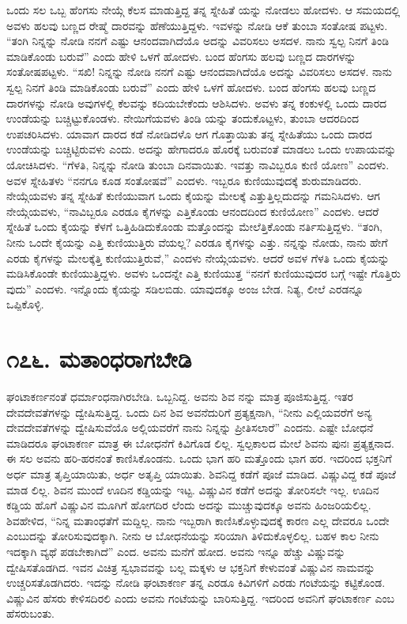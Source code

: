 ಒಂದು ಸಲ ಒಬ್ಬ ಹೆಂಗಸು ನೇಯ್ಗೆ ಕೆಲಸ ಮಾಡುತ್ತಿದ್ದ ತನ್ನ ಸ್ನೇಹಿತೆ ಯನ್ನು ನೋಡಲು ಹೋದಳು. ಆ ಸಮಯದಲ್ಲಿ ಅವಳು ಹಲವು ಬಣ್ಣದ ರೇಷ್ಮೆ ದಾರವನ್ನು ಹೆಣೆಯುತ್ತಿದ್ದಳು. ಇವಳನ್ನು ನೋಡಿ ಆಕೆ ತುಂಬಾ ಸಂತೋಷ ಪಟ್ಟಳು. “ತಂಗಿ ನಿನ್ನನ್ನು ನೋಡಿ ನನಗೆ ಎಷ್ಟು ಆನಂದವಾಗಿದೆಯೊ ಅದನ್ನು ವಿವರಿಸಲು ಅಸದಳ. ನಾನು ಸ್ವಲ್ಪ ನಿನಗೆ ತಿಂಡಿ ಮಾಡಿಕೊಂಡು ಬರುವೆ” ಎಂದು ಹೇಳಿ ಒಳಗೆ ಹೋದಳು. ಬಂದ ಹೆಂಗಸು ಹಲವು ಬಣ್ಣದ ದಾರಗಳನ್ನು ಸಂತೋಷಪಟ್ಟಳು. “ಸಖಿ! ನಿನ್ನನ್ನು ನೋಡಿ ನನಗೆ ಎಷ್ಟು ಆನಂದವಾಗಿದೆಯೊ ಅದನ್ನು ವಿವರಿಸಲು ಅಸದಳ. ನಾನು ಸ್ವಲ್ಪ ನಿನಗೆ ತಿಂಡಿ ಮಾಡಿಕೊಂಡು ಬರುವೆ” ಎಂದು ಹೇಳಿ ಒಳಗೆ ಹೋದಳು. ಬಂದ ಹೆಂಗಸು ಹಲವು ಬಣ್ಣದ ದಾರಗಳನ್ನು ನೋಡಿ ಅವುಗಳಲ್ಲಿ ಕೆಲವನ್ನು ಕದಿಯಬೇಕೆಂದು ಆಶಿಸಿದಳು. ಅವಳು ತನ್ನ ಕಂಕುಳಲ್ಲಿ ಒಂದು ದಾರದ ಉಂಡೆಯನ್ನು ಬಚ್ಚಿಟ್ಟುಕೊಂಡಳು. ನೇಯಿಗೆಯವಳು ತಿಂಡಿ ಯನ್ನು ತಂದುಕೊಟ್ಟಳು, ತುಂಬಾ ಆದರದಿಂದ ಉಪಚರಿಸಿದಳು. ಯಾವಾಗ ದಾರದ ಕಡೆ ನೋಡಿದಳೊ ಆಗ ಗೊತ್ತಾಯಿತು ತನ್ನ ಸ್ನೇಹಿತೆಯು ಒಂದು ದಾರದ ಉಂಡೆಯನ್ನು ಬಚ್ಚಿಟ್ಟಿರುವಳು ಎಂದು. ಅದನ್ನು ಹೇಗಾದರೂ ಹೊರಕ್ಕೆ ಬರುವಂತೆ ಮಾಡಲು ಒಂದು ಉಪಾಯವನ್ನು ಯೋಚಿಸಿದಳು. “ಗೆಳತಿ, ನಿನ್ನನ್ನು ನೋಡಿ ತುಂಬಾ ದಿನವಾಯಿತು. ಇವತ್ತು ನಾವಿಬ್ಬರೂ ಕುಣಿ ಯೋಣ” ಎಂದಳು. ಅವಳ ಸ್ನೇಹಿತಳು “ನನಗೂ ಕೂಡ ಸಂತೋಷವೆ” ಎಂದಳು. ಇಬ್ಬರೂ ಕುಣಿಯುವುದಕ್ಕೆ ಶುರುಮಾಡಿದರು. ನೇಯ್ಗೆಯವಳು ತನ್ನ ಸ್ನೇಹಿತೆ ಕುಣಿಯುವಾಗ ಒಂದು ಕೈಯನ್ನು ಮೇಲಕ್ಕೆ ಎತ್ತುತ್ತಿಲ್ಲದುದನ್ನು ಗಮನಿಸಿದಳು. ಆಗ ನೇಯ್ಗೆಯವಳು, “ನಾವಿಬ್ಬರೂ ಎರಡೂ ಕೈಗಳನ್ನು ಎತ್ತಿಕೊಂಡು ಆನಂದದಿಂದ ಕುಣಿಯೋಣ” ಎಂದಳು. ಆದರೆ ಸ್ನೇಹಿತೆ ಒಂದು ಕೈಯನ್ನು ಕೆಳಗೆ ಒತ್ತಿಹಿಡಿದುಕೊಂಡು ಮತ್ತೊಂದನ್ನು ಮೇಲೆತ್ತಿಕೊಂಡು ನರ್ತಿಸುತ್ತಿದ್ದಳು. “ತಂಗಿ, ನೀನು ಒಂದೇ ಕೈಯನ್ನು ಎತ್ತಿ ಕುಣಿಯುತ್ತಿರು ವೆಯಲ್ಲ? ಎರಡೂ ಕೈಗಳನ್ನು ಎತ್ತು. ನನ್ನನ್ನು ನೋಡು, ನಾನು ಹೇಗೆ ಎರಡು ಕೈಗಳನ್ನು ಮೇಲಕ್ಕೆತ್ತಿ ಕುಣಿಯುತ್ತಿರುವೆ,” ಎಂದಳು ನೇಯ್ಗೆಯವಳು. ಆದರೆ ಅವಳ ಗೆಳತಿ ಒಂದು ಕೈಯನ್ನು ಮಡಿಸಿಕೊಂಡೇ ಕುಣಿಯುತ್ತಿದ್ದಳು. ಅವಳು ಒಂದನ್ನೇ ಎತ್ತಿ ಕುಣಿಯುತ್ತ “ನನಗೆ ಕುಣಿಯುವುದರ ಬಗ್ಗೆ ಇಷ್ಟೇ ಗೊತ್ತಿರು ವುದು” ಎಂದಳು. ಇನ್ನೊಂದು ಕೈಯನ್ನು ಸಡಿಲಬಿಡು. ಯಾವುದಕ್ಕೂ ಅಂಜ ಬೇಡ. ನಿತ್ಯ, ಲೀಲೆ ಎರಡನ್ನೂ ಒಪ್ಪಿಕೊಳ್ಳಿ.


\section{\num{೧೭೬. } ಮತಾಂಧರಾಗಬೇಡಿ}

ಘಂಟಾಕರ್ಣನಂತೆ ಧರ್ಮಾಂಧನಾಗಿರಬೇಡಿ. ಒಬ್ಬನಿದ್ದ. ಅವನು ಶಿವ ನನ್ನು ಮಾತ್ರ ಪೂಜಿಸುತ್ತಿದ್ದ. ಇತರ ದೇವದೇವತೆಗಳನ್ನು ದ್ವೇಷಿಸುತ್ತಿದ್ದ. ಒಂದು ದಿನ ಶಿವ ಅವನೆದುರಿಗೆ ಪ್ರತ್ಯಕ್ಷನಾಗಿ, “ನೀನು ಎಲ್ಲಿಯವರೆಗೆ ಅನ್ಯ ದೇವದೇವತೆಗಳನ್ನು ದ್ವೇಷಿಸುವೆಯೊ ಅಲ್ಲಿಯವರೆಗೆ ನಾನು ನಿನ್ನನ್ನು ಪ್ರೀತಿಸಲಾರೆ” ಎಂದನು. ಎಷ್ಟೇ ಬೋಧನೆ ಮಾಡಿದರೂ ಘಂಟಾಕರ್ಣ ಮಾತ್ರ ಈ ಬೋಧನೆಗೆ ಕಿವಿಗೊಡ ಲಿಲ್ಲ. ಸ್ವಲ್ಪಕಾಲದ ಮೇಲೆ ಶಿವನು ಪುನಃ ಪ್ರತ್ಯಕ್ಷನಾದ. ಈ ಸಲ ಅವನು ಹರಿ-ಹರನಂತೆ ಕಾಣಿಸಿಕೊಂಡನು. ಒಂದು ಭಾಗ ಹರಿ ಮತ್ತೊಂದು ಭಾಗ ಹರ. ಇದರಿಂದ ಭಕ್ತನಿಗೆ ಅರ್ಧ ಮಾತ್ರ ತೃಪ್ತಿಯಾಯಿತು, ಅರ್ಧ ಅತೃಪ್ತಿ ಯಾಯಿತು. ಶಿವನಿದ್ದ ಕಡೆಗೆ ಪೂಜೆ ಮಾಡಿದ. ವಿಷ್ಣುವಿದ್ದ ಕಡೆ ಪೂಜೆ ಮಾಡ ಲಿಲ್ಲ. ಶಿವನ ಮುಂದೆ ಊದಿನ ಕಡ್ಡಿಯನ್ನು ಇಟ್ಟ. ವಿಷ್ಣುವಿನ ಕಡೆಗೆ ಅದನ್ನು ತೋರಿಸಲೇ ಇಲ್ಲ. ಊದಿನ ಕಡ್ಡಿಯ ಹೊಗೆ ವಿಷ್ಣುವಿನ ಮೂಗಿಗೆ ಹೋಗದಿರ ಲೆಂದು ಅದನ್ನು ಮುಚ್ಚುವುದಕ್ಕೂ ಅವನು ಹಿಂಜರಿಯಲಿಲ್ಲ. ಶಿವಹೇಳಿದ, “ನಿನ್ನ ಮತಾಂಧತೆಗೆ ಮದ್ದಿಲ್ಲ. ನಾನು ಇಬ್ಬರಾಗಿ ಕಾಣಿಸಿಕೊಳ್ಳುವುದಕ್ಕೆ ಕಾರಣ ಎಲ್ಲ ದೇವರೂ ಒಂದೇ ಎಂಬುದನ್ನು ತೋರಿಸುವುದಕ್ಕಾಗಿ. ನೀನು ಆ ಬೋಧನೆಯನ್ನು ಸರಿಯಾಗಿ ತಿಳಿದುಕೊಳ್ಳಲಿಲ್ಲ. ಬಹಳ ಕಾಲ ನೀನು ಇದಕ್ಕಾಗಿ ವ್ಯಥೆ ಪಡಬೇಕಾಗಿದೆ” ಎಂದ. ಅವನು ಮನೆಗೆ ಹೋದ. ಅವನು ಇನ್ನೂ ಹೆಚ್ಚು ವಿಷ್ಣುವನ್ನು ದ್ವೇಷಿಸತೊಡಗಿದ. ಇವನ ವಿಚಿತ್ರ ಸ್ವಭಾವವನ್ನು ಬಲ್ಲ ಮಕ್ಕಳು ಆ ಭಕ್ತನಿಗೆ ಕೇಳುವಂತೆ ವಿಷ್ಣುವಿನ ನಾಮವನ್ನು ಉಚ್ಚರಿಸತೊಡಗಿದರು. ಇದನ್ನು ನೋಡಿ ಘಂಟಾಕರ್ಣ ತನ್ನ ಎರಡೂ ಕಿವಿಗಳಿಗೆ ಎರಡು ಗಂಟೆಯನ್ನು ಕಟ್ಟಿಕೊಂಡ. ವಿಷ್ಣುವಿನ ಹೆಸರು ಕೇಳಿಸದಿರಲಿ ಎಂದು ಅವನು ಗಂಟೆಯನ್ನು ಬಾರಿಸುತ್ತಿದ್ದ. ಇದರಿಂದ ಅವನಿಗೆ ಘಂಟಾಕರ್ಣ ಎಂಬ ಹೆಸರುಬಂತು.



